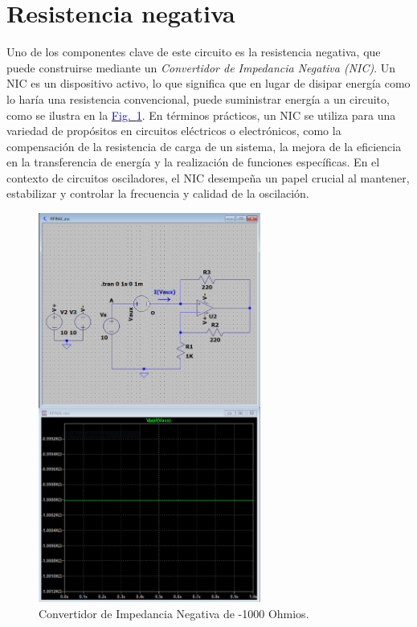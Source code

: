 \documentclass[12pt,a4paper]{report} %
\newcommand{\fref}[1]{\hyperref[#1]{\textcolor{blue}{Fig.~\ref*{#1}}}}
\newcommand{\fref}[1]{\hyperref[#1]{\textcolor{blue}{\textit{Fig.~\ref*{#1}}}}}
\begin{document}
	\newpage
	\section{Resistencia negativa}
	
	\noindent Uno de los componentes clave de este circuito es la resistencia negativa, que puede construirse mediante un \emph{Convertidor de Impedancia Negativa (NIC)}. Un NIC es un dispositivo activo, lo que significa que en lugar de disipar energía como lo haría una resistencia convencional, puede suministrar energía a un circuito, como se ilustra en la \fref{fig:NIC}. En términos prácticos, un NIC se utiliza para una variedad de propósitos en circuitos eléctricos o electrónicos, como la compensación de la resistencia de carga de un sistema, la mejora de la eficiencia en la transferencia de energía y la realización de funciones específicas.
	En el contexto de circuitos osciladores, el NIC desempeña un papel crucial al mantener, estabilizar y controlar la frecuencia y calidad de la oscilación.
	 
	\begin{figure}[h]
		\centering
		\includegraphics[width=0.65\textwidth]{NIC_B.jpg}
		\caption{Convertidor de Impedancia Negativa de -1000 Ohmios.}
		\label{fig:NIC}
	\end{figure}
	
\end{document}
